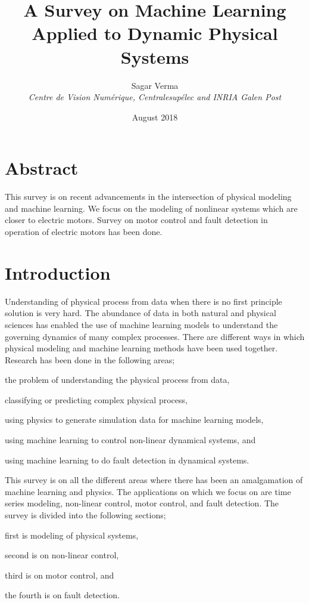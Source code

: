 \documentclass[conference]{IEEEtran}
\begin{document}
\title{A Survey on Machine Learning Applied to Dynamic Physical Systems}
\author{Sagar Verma \\
        \textit{Centre de Vision Num\'erique,
        Centralesup\'elec and INRIA Galen Post}
        }
\date{August 2018}

\maketitle

\section{Abstract}
This survey is on recent advancements in the intersection of physical modeling and machine learning. We focus on the modeling of nonlinear systems which are closer to electric motors. Survey on motor control and fault detection in operation of electric motors has been done. \\

\section{Introduction}
Understanding of physical process from data when there is no first principle solution is very hard. The abundance of data in both natural and physical sciences has enabled the use of machine learning models to understand the governing dynamics of many complex processes. There are different ways in which physical modeling and machine learning methods have been used together. Research has been done in the following areas; \begin{enumerate*} [label=\itshape\alph*\upshape)] \item the problem of understanding the physical process from data, \item classifying or predicting complex physical process, \item using physics to generate simulation data for machine learning models, \item using machine learning to control non-linear dynamical systems, and \item using machine learning to do fault detection in dynamical systems. \end{enumerate*}

This survey is on all the different areas where there has been an amalgamation of machine learning and physics. The applications on which we focus on are time series modeling, non-linear control, motor control, and fault detection. The survey is divided into the following sections; \begin{enumerate*}[label=\itshape\roman*\upshape)]  \setcounter{enumi}{2} \item first is modeling of physical systems, \item second is on non-linear control, \item third is on motor control, and \item the fourth is on fault detection. \end{enumerate*} \\
\end{document}
